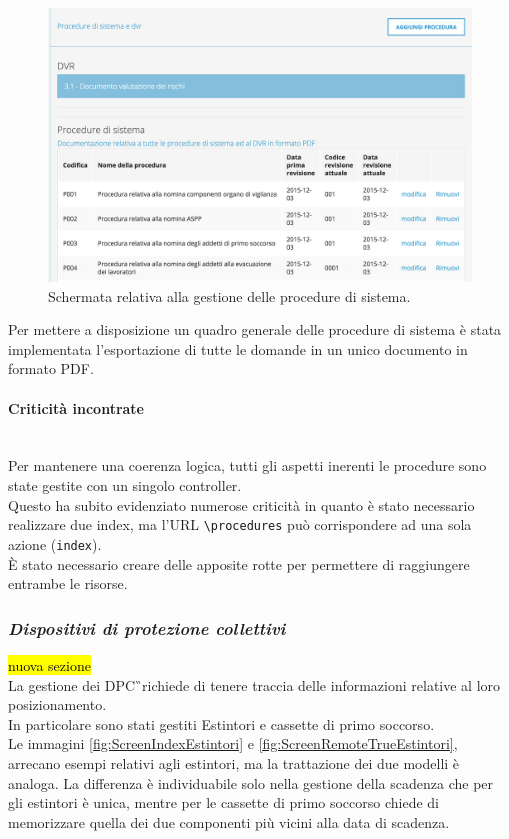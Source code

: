 			\begin{figure}[H]
				\begin{center}
					\includegraphics[width=14cm]{Pics/ScreenDVR.png}
					\caption{Schermata relativa alla gestione delle procedure di sistema.}
					\label{fig:ScreenDVR}
				\end{center}
			\end{figure}
			Per mettere a disposizione un quadro generale delle procedure di sistema è stata implementata l'esportazione di tutte le domande in un unico documento in formato PDF.

	\paragraph*{Criticità incontrate}\mbox{}\\
		Per mantenere una coerenza logica, tutti gli aspetti inerenti le procedure sono state gestite con un singolo controller.\\
		Questo ha subito evidenziato numerose criticità in quanto è stato necessario realizzare due index, ma l'URL \texttt{\textbackslash procedures} può corrispondere ad una sola azione (\texttt{index}).\\
		È stato necessario creare delle apposite rotte per permettere di raggiungere entrambe le risorse.
\newpage
\subsubsection{\textit{Dispositivi di protezione collettivi}}
\hl{nuova sezione}\\
La gestione dei \gls{DPC}\G\ richiede di tenere traccia delle informazioni relative al loro posizionamento. \\
In particolare sono stati gestiti Estintori e cassette di primo soccorso. \\
Le immagini \autoref{fig:ScreenIndexEstintori} e \autoref{fig:ScreenRemoteTrueEstintori}, arrecano esempi relativi agli estintori, ma la trattazione dei due modelli è analoga. La differenza è individuabile solo nella gestione della scadenza che per gli estintori è unica, mentre per le cassette di primo soccorso chiede di memorizzare quella dei due componenti più vicini alla data di scadenza.

